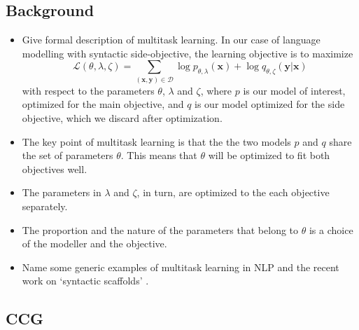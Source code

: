 \subsection{Background}
\begin{itemize}
  \item Give formal description of multitask learning. In our case of language modelling with syntactic side-objective, the learning objective is to maximize
  \begin{equation*}
    \mathcal{L}(\theta, \lambda, \zeta) = \sum_{ (\mathbf{x}, \mathbf{y}) \in \mathcal{D} }\log p_{\theta, \lambda}(\mathbf{x}) + \log q_{\theta,\zeta}(\mathbf{y} | \mathbf{x})
  \end{equation*}
  with respect to the parameters $\theta$, $\lambda$ and $\zeta$, where $p$ is our model of interest, optimized for the main objective, and $q$ is our model optimized for the side objective, which we discard after optimization.
  \item The key point of multitask learning is that the the two models $p$ and $q$ share the set of parameters $\theta$. This means that $\theta$ will be optimized to fit both objectives well.
  \item The parameters in $\lambda$ and $\zeta$, in turn, are optimized to the each objective separately.
  \item The proportion and the nature of the parameters that belong to $\theta$ is a choice of the modeller and the objective.
  \item Name some generic examples of multitask learning in NLP \citep{Zhang+2016:multitask,Goldberg+2016:multitask} and the recent work on `syntactic scaffolds' \citep{Swayamdipta+2018:scaffold}.
\end{itemize}

\subsection{CCG}
